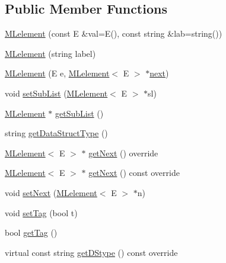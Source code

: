 \subsection*{Public Member Functions}
\begin{DoxyCompactItemize}
\item 
\hyperlink{classbridges_1_1_m_lelement_a5d0e64b99abf4d1ad1d2cc89ca28343c}{M\+Lelement} (const E \&val=E(), const string \&lab=string())
\item 
\hyperlink{classbridges_1_1_m_lelement_ade42b08d96030f1ed5b92c5613d5cedd}{M\+Lelement} (string label)
\item 
\hyperlink{classbridges_1_1_m_lelement_aaab4924754f94138bb110efd4c047411}{M\+Lelement} (E e, \hyperlink{classbridges_1_1_m_lelement}{M\+Lelement}$<$ E $>$ $\ast$\hyperlink{classbridges_1_1_s_lelement_ad7449d10a09ebc52653a7baed812aa43}{next})
\item 
void \hyperlink{classbridges_1_1_m_lelement_ad436f6424e7542ac92df93509f16c7e7}{set\+Sub\+List} (\hyperlink{classbridges_1_1_m_lelement}{M\+Lelement}$<$ E $>$ $\ast$sl)
\item 
\hyperlink{classbridges_1_1_m_lelement}{M\+Lelement} $\ast$ \hyperlink{classbridges_1_1_m_lelement_a55f82b59284e22caef23959e023614cc}{get\+Sub\+List} ()
\item 
string \hyperlink{classbridges_1_1_m_lelement_a49e5d132e80531f005e1d2da666f0c39}{get\+Data\+Struct\+Type} ()
\item 
\hyperlink{classbridges_1_1_m_lelement}{M\+Lelement}$<$ E $>$ $\ast$ \hyperlink{classbridges_1_1_m_lelement_aceebd292e7d497f44eea5c4845e7709f}{get\+Next} () override
\item 
\hyperlink{classbridges_1_1_m_lelement}{M\+Lelement}$<$ E $>$ $\ast$ \hyperlink{classbridges_1_1_m_lelement_ab9892a7e5458ae1210a9ac414ce45dde}{get\+Next} () const  override
\item 
void \hyperlink{classbridges_1_1_m_lelement_aec9747cee60fcafbe474709a9dad21dc}{set\+Next} (\hyperlink{classbridges_1_1_m_lelement}{M\+Lelement}$<$ E $>$ $\ast$n)
\item 
void \hyperlink{classbridges_1_1_m_lelement_a525e43688c15f38382b2d471e1b8d39f}{set\+Tag} (bool t)
\item 
bool \hyperlink{classbridges_1_1_m_lelement_a7ac084867fd83d7742f0a305e44e523a}{get\+Tag} ()
\item 
virtual const string \hyperlink{classbridges_1_1_m_lelement_a3d136c3a12f58a7191ce27bbf08cadfb}{get\+D\+Stype} () const  override
\end{DoxyCompactItemize}
